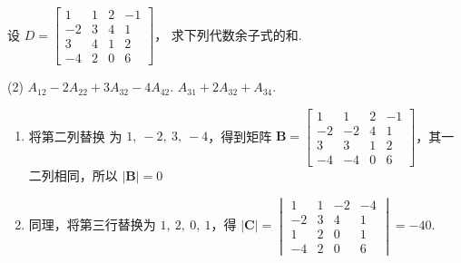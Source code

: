 \begin{problem}[本题6分]
  设 $D = 
  \begin{bmatrix}
    1  & 1 & 2 & -1\\
    -2 & 3 & 4 & 1 \\
    3  & 4 & 1 & 2 \\
    -4 & 2 & 0 & 6
  \end{bmatrix}$，
  求下列代数余子式的和.
  \begin{tasks}[label = \arabic*.](2)
    \task $A_{12} - 2A_{22} +
          3A_{32} - 4A_{42}$.
    \task $A_{31} + 2A_{32} + A_{34}$.
  \end{tasks}
\end{problem}
\scratch[8ex]
\begin{solution}\leavevmode
  \begin{enumerate}
    \item 将第二列替换 为 $1,~ -2,~ 3,~ -4$，得到矩阵 $\mathbf B =
    \begin{bmatrix}
      1  &  1 & 2 & -1\\
      -2 & -2 & 4 & 1 \\
      3  &  3 & 1 & 2 \\
      -4 & -4 & 0 & 6
    \end{bmatrix}$，其一二列相同，所以 $|\mathbf B| = 0$
    \item 同理，将第三行替换为 $1,~ 2,~ 0,~ 1$，得 $|\mathbf C| =
    \begin{vmatrix}
      1  & 1 & -2 & -4\\
      -2 & 3 &  4 & 1 \\
      1  & 2 &  0 & 1 \\
      -4 & 2 &  0 & 6
    \end{vmatrix} = -40$.
  \end{enumerate}
\end{solution}

